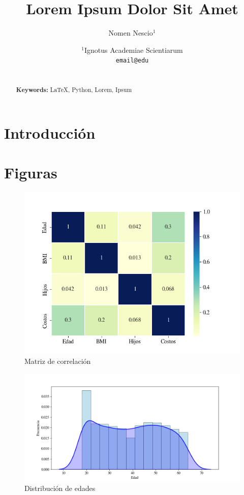 \documentclass[a4paper]{article}
\title{Lorem Ipsum Dolor Sit Amet}
\author{Nomen Nescio$^1$}
\date{$^1$Ignotus Academiae Scientiarum \\ \texttt{email@edu}}
\begin{document}
	\maketitle
	
	\begin{abstract}        
        \lipsum[1]  \\
		\noindent\textbf{Keywords:} \LaTeX, Python, Lorem, Ipsum
	\end{abstract}

    \section{Introducción}
    \lipsum[2-3]

    \section{Figuras}
    \lipsum[4]

    \begin{figure}[ht]
        \centering
        \includegraphics[width=\textwidth]{correlacion.png}
        \caption{Matriz de correlación}
        \label{fig:correlacion}
    \end{figure}

    \begin{figure}[ht]
        \centering
        \includegraphics[width=\textwidth]{edades.png}
        \caption{Distribución de edades}
        \label{fig:edades}
    \end{figure}
\end{document}

